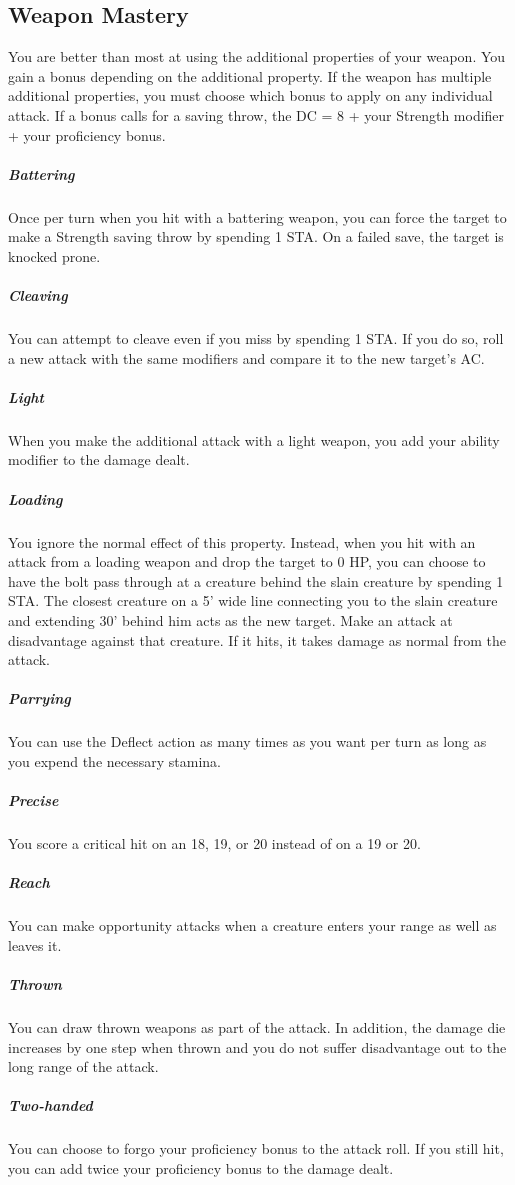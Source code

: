\subsection{Weapon Mastery}

You are better than most at using the additional properties of your weapon. You gain a bonus depending on the additional property. If the weapon has multiple additional properties, you must choose which bonus to apply on any individual attack. If a bonus calls for a saving throw, the DC = 8 + your Strength modifier + your proficiency bonus.

\subparagraph*{Battering} Once per turn when you hit with a battering weapon, you can force the target to make a Strength saving throw by spending 1 STA. On a failed save, the target is knocked prone.

\subparagraph*{Cleaving} You can attempt to cleave even if you miss by spending 1 STA. If you do so, roll a new attack with the same modifiers and compare it to the new target's AC.

\subparagraph*{Light} When you make the additional attack with a light weapon, you add your ability modifier to the damage dealt.

\subparagraph*{Loading} You ignore the normal effect of this property. Instead, when you hit with an attack from a loading weapon and drop the target to 0 HP, you can choose to have the bolt pass through at a creature behind the slain creature by spending 1 STA. The closest creature on a 5' wide line connecting you to the slain creature and extending 30' behind him acts as the new target. Make an attack at disadvantage against that creature. If it hits, it takes damage as normal from the attack.

\subparagraph*{Parrying} You can use the Deflect action as many times as you want per turn as long as you expend the necessary stamina.

\subparagraph*{Precise} You score a critical hit on an 18, 19, or 20 instead of on a 19 or 20.

\subparagraph*{Reach} You can make opportunity attacks when a creature enters your range as well as leaves it.

\subparagraph*{Thrown} You can draw thrown weapons as part of the attack. In addition, the damage die increases by one step when thrown and you do not suffer disadvantage out to the long range of the attack.

\subparagraph*{Two-handed} You can choose to forgo your proficiency bonus to the attack roll. If you still hit, you can add twice your proficiency bonus to the damage dealt.

